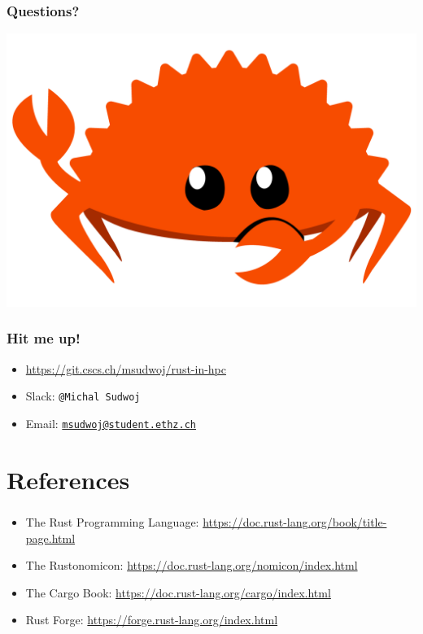 \documentclass[aspectratio=43, t]{beamer}
\begin{document}
\begin{frame}
	\frametitle{Questions?}

	\includegraphics[width = \textwidth, height = \textheight, keepaspectratio]{rustacean-flat-gesture}
\end{frame}

\begin{frame}
	\frametitle{Hit me up!}

	\begin{itemize}
		\item \url{https://git.cscs.ch/msudwoj/rust-in-hpc}
		\item Slack: \texttt{@Michal Sudwoj}
		\item Email: \texttt{\href{mailto:msudwoj@student.ethz.ch}{msudwoj@student.ethz.ch}}
	\end{itemize}
\end{frame}


\section*{References}
\begin{frame}
	\frametitle{\secname}

	\begin{itemize}
		\item The Rust Programming Language: \url{https://doc.rust-lang.org/book/title-page.html}
		\item The Rustonomicon: \url{https://doc.rust-lang.org/nomicon/index.html}
		\item The Cargo Book: \url{https://doc.rust-lang.org/cargo/index.html}
		\item Rust Forge: \url{https://forge.rust-lang.org/index.html}
	\end{itemize}
\end{frame}
\end{document}
